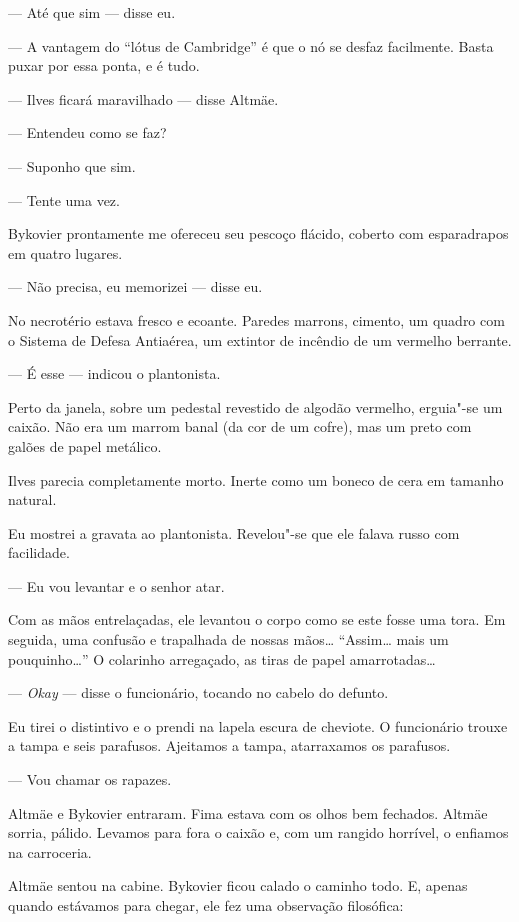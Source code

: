 --- Até que sim --- disse eu.

--- A vantagem do ``lótus de Cambridge'' é que o nó se desfaz facilmente.
Basta puxar por essa ponta, e é tudo.

--- Ilves ficará maravilhado --- disse Altmäe.

--- Entendeu como se faz?

--- Suponho que sim.

--- Tente uma vez.

Bykovier prontamente me ofereceu seu pescoço flácido, coberto com
esparadrapos em quatro lugares.

--- Não precisa, eu memorizei --- disse eu.

No necrotério estava fresco e ecoante. Paredes marrons, cimento, um
quadro com o Sistema de Defesa Antiaérea, um extintor de incêndio de um
vermelho berrante.

--- É esse --- indicou o plantonista.

Perto da janela, sobre um pedestal revestido de algodão vermelho,
erguia"-se um caixão. Não era um marrom banal (da cor de um cofre), mas
um preto com galões de papel metálico.

Ilves parecia completamente morto. Inerte como um boneco de cera em
tamanho natural.

Eu mostrei a gravata ao plantonista. Revelou"-se que ele falava russo com
facilidade.

--- Eu vou levantar e o senhor atar.

Com as mãos entrelaçadas, ele levantou o corpo como se este fosse uma
tora. Em seguida, uma confusão e trapalhada de nossas mãos\ldots{}
``Assim\ldots{} mais um pouquinho\ldots{}'' O colarinho arregaçado, as tiras de
papel amarrotadas\ldots{}

--- \emph{Okay} --- disse o funcionário, tocando no cabelo do
defunto.

Eu tirei o distintivo e o prendi na lapela escura de cheviote. O
funcionário trouxe a tampa e seis parafusos. Ajeitamos a tampa,
atarraxamos os parafusos.

--- Vou chamar os rapazes.

Altmäe e Bykovier entraram. Fima estava com os olhos bem fechados.
Altmäe sorria, pálido. Levamos para fora o caixão e, com um rangido
horrível, o enfiamos na carroceria.

Altmäe sentou na cabine. Bykovier ficou calado o caminho todo. E, apenas
quando estávamos para chegar, ele fez uma observação filosófica:

